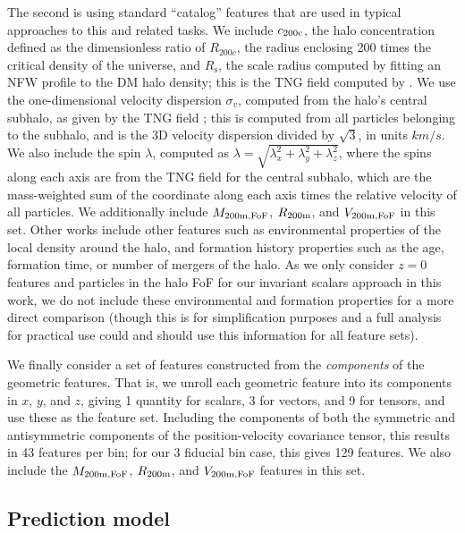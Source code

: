 The second is using standard ``catalog'' features that are used in typical approaches to this and related tasks.
We include $c_\mathrm{200c}$, the halo concentration defined as the dimensionless ratio of $R_{200c}$, the radius enclosing 200 times the critical density of the universe, and $R_\mathrm{s}$, the scale radius computed by fitting an NFW profile to the DM halo density; this is the TNG field  computed by \cite{anbajagane_baryonic_2021}.
We use the one-dimensional velocity dispersion $\sigma_{v}$, computed from the halo's central \dark subhalo, as given by the TNG field ; this is computed from all particles belonging to the subhalo, and is the 3D velocity dispersion divided by $\sqrt{3}$, in units $km/s$.
We also include the spin $\lambda$, computed as $\lambda = \sqrt{\lambda_x^2 + \lambda_y^2 + \lambda_z^2}$, where the spins along each axis are from the TNG field  for the central \dark subhalo, which are the mass-weighted sum of the coordinate along each axis times the relative velocity of all particles.
We additionally include $M_\mathrm{200m,FoF}$, $R_\mathrm{200m}$, and $V_\mathrm{200m,FoF}$ in this set.
Other works include other features such as environmental properties of the local density around the halo, and formation history properties such as the age, formation time, or number of mergers of the halo.
As we only consider $z=0$ features and particles in the halo FoF for our invariant scalars approach in this work, we do not include these environmental and formation properties for a more direct comparison (though this is for simplification purposes and a full analysis for practical use could and should use this information for all feature sets).

We finally consider a set of features constructed from the \emph{components} of the geometric features.
That is, we unroll each geometric feature into its components in $x$, $y$, and $z$, giving 1 quantity for scalars, 3 for vectors, and 9 for tensors, and use these as the feature set. 
Including the components of both the symmetric and antisymmetric components of the position-velocity covariance tensor, this results in 43 features per bin; for our 3 fiducial bin case, this gives 129 features.
We also include the $M_\mathrm{200m,FoF}$, $R_\mathrm{200m}$, and $V_\mathrm{200m,FoF}$ features in this set.


\subsection{Prediction model}
\label{sec:prediction_model}

